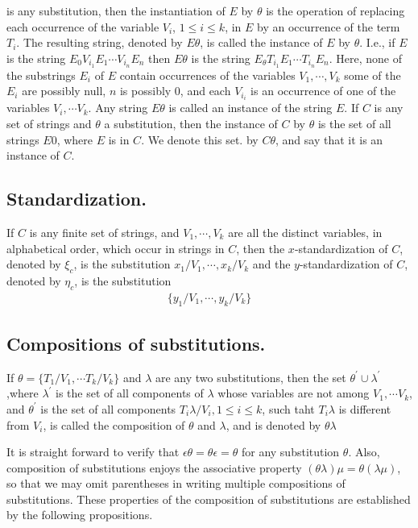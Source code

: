 \documentclass[8pt]{extarticle}
\begin{document}
is any substitution, then the instantiation of $E$ by $\theta$ is the operation of replacing each occurrence of the variable $V_i$, $1 \leq i \leq k$, in $E$ by an occurrence of the term $T_i$. The resulting string, denoted by $E\theta$, is called the instance of $E$ by $\theta$. I.e., if $E$ is the string $E_0V_{i_1}E_1 \dotsm V_{i_n}E_n$ then $E\theta$ is the string $E_\theta T_{i_1}E_1\dotsm T_{i_n}E_n$. Here, none of the substrings $E_i$ of $E$ contain occurrences of the variables $V_1, \dotsm , V_k$ some of the $E_i$ are possibly null, $n$ is possibly $0$, and each $V_{i_i}$ is an occurrence of one of the variables $V_i,\dotsm V_k$. Any string $E\theta$ is called an instance of the
string $E$. If $C$ is any set of strings and $\theta$ a substitution, then the instance of $C$ by $\theta$ is the set of all strings $E0$, where $E$ is in $C$. We denote this set. by $C\theta$, and say that it is an instance of $C$.

\subsection{Standardization.}

If $C$ is any finite set of strings, and $V_1, \dotsm , V_k$ are
all the distinct variables, in alphabetical order, which occur in strings in $C$, then
the $x$-standardization of $C$, denoted by $\xi_c$, is the substitution
$x_1/V_1,\dotsm,x_k/V_k$
and the $y$-standardization of $C$, denoted by $\eta_c$, is the substitution
\begin{align*}
    \{y_1/V_1,\dotsm,y_k/V_k\}
\end{align*}

\subsection{Compositions of substitutions.}

If $\theta = \{T_1/V_1,\dotsm T_k/V_k\}$ and $\lambda$ are any
two substitutions, then the set $\theta^\prime \cup \lambda^\prime$ ,where $\lambda^\prime$ is the set of all components of $\lambda$
whose variables are not among $V_1,\dotsm V_k$, and $\theta^\prime$ is the set of all components
$T_i\lambda/V_i, 1 \leq i \leq k$, such taht $T_i\lambda$ is different from $V_i$, is called the composition of $\theta$ and $\lambda$, and is denoted by $\theta\lambda$

It is straight forward to verify that $\epsilon\theta = \theta\epsilon = \theta$ for any substitution $\theta$. Also,
composition of substitutions enjoys the associative property $(\theta\lambda)\mu = \theta(\lambda\mu)$, so
that we may omit parentheses in writing multiple compositions of substitutions. 
These properties of the composition of substitutions are established by the following propositions.
\end{document}
